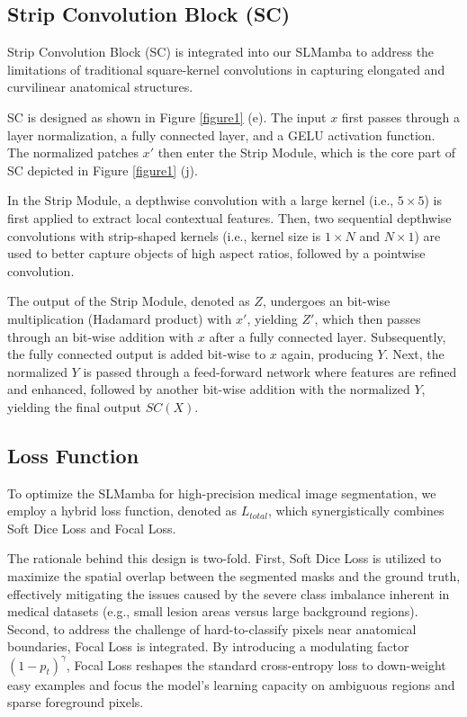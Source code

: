 \documentclass[10pt, a4paper, twocolumn]{article}
\begin{document}
\subsection{Strip Convolution Block (SC)}

Strip Convolution Block (SC)\cite{hou2020strip,liu2023slak,chu2021active} is integrated into our SLMamba to address the limitations of traditional square-kernel convolutions in capturing elongated and curvilinear anatomical structures.

SC is designed as shown in Figure \textcolor{red}{\ref{figure1}} (e). The input $x$ first passes through a layer normalization, a fully connected layer, and a GELU activation function\cite{hendrycks2016gelu}. The normalized patches $x'$ then enter the Strip Module, which is the core part of SC depicted in Figure \textcolor{red}{\ref{figure1}} (j).

In the Strip Module, a depthwise convolution with a large kernel (i.e., $5 \times 5$) is first applied to extract local contextual features. Then, two sequential depthwise convolutions with strip-shaped kernels (i.e., kernel size is $1 \times N$ and $N \times 1$) are used to better capture objects of high aspect ratios, followed by a pointwise convolution.

The output of the Strip Module, denoted as $Z$, undergoes an bit-wise multiplication (Hadamard product) with $x'$, yielding $Z'$, which then passes through an bit-wise addition with $x$ after a fully connected layer. Subsequently, the fully connected output is added bit-wise to $x$ again, producing $Y$. Next, the normalized $Y$ is passed through a feed-forward network where features are refined and enhanced, followed by another bit-wise addition with the normalized $Y$, yielding the final output $SC(X)$.


\subsection{Loss Function}

To optimize the SLMamba for high-precision medical image segmentation, we employ a hybrid loss function, denoted as $L_{total}$, which synergistically combines Soft Dice Loss and Focal Loss.

The rationale behind this design is two-fold. First, Soft Dice Loss is utilized to maximize the spatial overlap between the segmented masks and the ground truth, effectively mitigating the issues caused by the severe class imbalance inherent in medical datasets (e.g., small lesion areas versus large background regions). Second, to address the challenge of hard-to-classify pixels near anatomical boundaries, Focal Loss is integrated. By introducing a modulating factor $(1 - p_t)^\gamma$, Focal Loss reshapes the standard cross-entropy loss to down-weight easy examples and focus the model's learning capacity on ambiguous regions and sparse foreground pixels.
\end{document}
